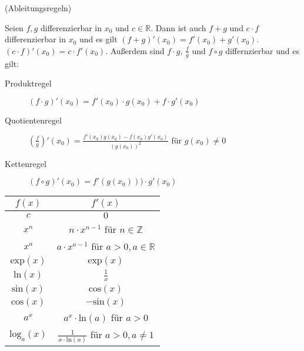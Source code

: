 (Ableitungsregeln)

Seien $f, g$ differenzierbar in $x_0$ und $c \in \mathbb{R}$. Dann ist auch $f+g$ und $c\cdot f$ differenzierbar in $x_0$ und es gilt $(f+g)'(x_0)=f'(x_0)+g'(x_0)$. $(c\cdot f)'(x_0) = c\cdot f'(x_0)$. Außerdem sind $f\cdot g$, $\frac{f}{g}$ und $f \circ g$ differnzierbar und es gilt:
\begin{description}
    \item[Produktregel]{$(f\cdot g)'(x_0) = f'(x_0)\cdot g(x_0) + f\cdot g'(x_0)$}
    \item[Quotientenregel]{$\left(\frac{f}{g}\right)'(x_0) = \frac{f'(x_0)g(x_0) - f(x_0)g'(x_0)}{(g(x_0))^2}$ für $g(x_0) \neq 0$}
    \item[Kettenregel]{$(f\circ g)'(x_0) = f'(g(x_0)))\cdot g'(x_0)$}
\end{description}

\begin{center}
\begin{tabular}{c|c}
$f(x)$ & $f'(x)$ \\ \hline
$c$ & $0$ \\
$x^n$ & $n \cdot x^{n-1}$ für $n \in \mathbb{Z}$ \\
$x^a$ & $a \cdot x^{a-1}$ für $a > 0, a \in \mathbb{R}$ \\
$\text{exp}(x)$ & $\text{exp}(x)$ \\
$\text{ln}(x)$ & $\frac{1}{x}$ \\
$\text{sin}(x)$ & $\text{cos}(x)$ \\
$\text{cos}(x)$ & $-\text{sin}(x)$ \\
$a^x$ & $a^x \cdot \text{ln}(a)$ für $a > 0$ \\
$\text{log}_a(x)$ & $\frac{1}{x\cdot\text{ln}(a)}$ für $a > 0, a \neq 1$
\end{tabular}
\end{center}
